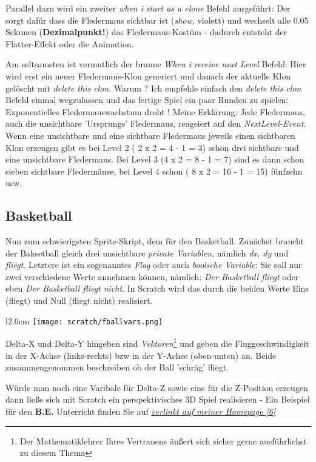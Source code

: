 \documentclass[10pt,a4paper,ngerman,twoside]{article} %
\begin{document}
Parallel dazu wird ein zweiter \textit{when i start as a clone} Befehl ausgeführt: Der sorgt dafür dass die Fledermaus sichtbar ist (\textit{show}, violett) und wechselt alle 0.05 Sekunen (\textbf{Dezimalpunkt!}) das Fledermaus-Kostüm - dadurch entsteht der Flatter-Effekt oder die Animation.

Am seltsamsten ist vermutlich der braune \textit{When i receive next Level} Befehl: Hier wird erst ein neuer Fledermaus-Klon generiert und danach der aktuelle Klon gelöscht mit \textit{delete this clon}. Warum ? Ich empfehle einfach den \textit{delete this clon} Befehl einmal wegzulassen und das fertige Spiel ein paar Runden zu spielen: Exponentielles Fledermauswachstum droht ! Meine Erklärung: Jede Fledermaus, auch die unsichtbare 'Ursprungs' Fledermaus, reageiert auf den \textit{NextLevel-Event}. Wenn eine unsichtbare und eine sichtbare Fledermaus jeweils einen sichtbaren Klon erzeugen gibt es bei Level 2 ( 2 x 2 = 4 - 1 = 3) schon drei sichtbare und eine unsichtbare Fledermaus. Bei Level 3 (4 x 2 = 8 - 1 = 7) sind es dann schon sieben sichtbare Fledermäuse, bei Level 4 schon ( 8 x 2 = 16 - 1 = 15) fünfzehn usw. 

\subsection*{Basketball}

Nun zum schwierigsten Sprite-Skript, dem für den Basketball. Zunächst braucht der Baksetball gleich drei unsichtbare  \textit{private Variablen}, nämlich \textit{dx, dy} und \textit{fliegt}. Letztere ist ein sogenanntes \textit{Flag} oder auch \textit{boolsche Variable}: Sie soll nur zwei verschiedene Werte annehmen können, nämlich: \textit{Der Basketball fliegt} oder eben  \textit{Der Basketball fliegt nicht}. In Scratch wird das durch die beiden Werte Eins (fliegt) und Null (fliegt nicht) realisiert. 

\begin{wrapfigure}{l}{2.0cm}
\texttt{[image: scratch/fballvars.png]}
\end{wrapfigure}
Delta-X und Delta-Y hingeben sind \textit{Vektoren}\footnote{Der Mathematiklehrer Ihres Vertrauens äußert sich sicher gerne ausführlichst zu diesem Thema} und geben die Fluggeschwindigkeit in der X-Achse (links-rechts) bzw in der Y-Achse (oben-unten) an. Beide zusammengenommen beschreiben ob der Ball 'schräg' fliegt. 

Würde man noch eine Varibale für Delta-Z sowie eine für die Z-Position erzeugen dann ließe sich mit Scratch ein perspektivisches 3D Spiel realisieren - Ein Beispiel für den \textbf{B.E.} Unterricht finden Sie auf \href{http://spielend-programmieren.at/en:tutorials:centralperspective}{\textit{verlinkt auf meiner Homepage [6]}}
\end{document}
